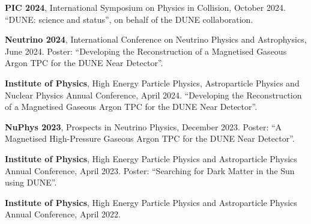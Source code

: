 \begin{list}{\scalebox{0.7}{$\square$}}{\leftmargin=1em \itemindent=0em}
	\item \textbf{PIC 2024}, International Symposium on Physics in Collision, October 2024. \newline ``DUNE: science and status'', on behalf of the DUNE collaboration.
	\item \textbf{Neutrino 2024}, International Conference on Neutrino Physics and Astrophysics, June 2024. \newline Poster: ``Developing the Reconstruction of a Magnetised Gaseous Argon TPC for the DUNE Near Detector''.
	\item \textbf{Institute of Physics}, High Energy Particle Physics, Astroparticle Physics and Nuclear Physics Annual Conference, April 2024. \newline ``Developing the Reconstruction of a Magnetised Gaseous Argon TPC for the DUNE Near Detector''.
	\item \textbf{NuPhys 2023}, Prospects in Neutrino Physics, December 2023. \newline Poster: ``A Magnetised High-Pressure Gaseous Argon TPC for the DUNE Near Detector''.
	\item \textbf{Institute of Physics}, High Energy Particle Physics and Astroparticle Physics Annual Conference, April 2023. \newline Poster: ``Searching for Dark Matter in the Sun using DUNE''.
	\item \textbf{Institute of Physics}, High Energy Particle Physics and Astroparticle Physics Annual Conference, April 2022.
\end{list}

